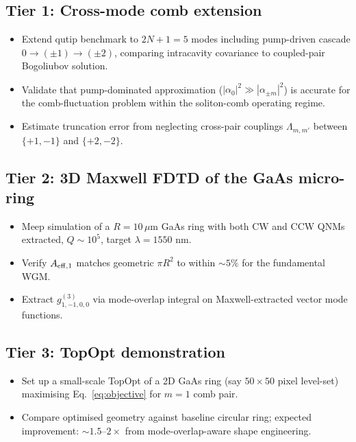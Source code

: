 \documentclass[11pt]{article}
\newcommand{\eff}{{\rm eff}}
\begin{document}
\subsection{Tier 1: Cross-mode comb extension}
\begin{itemize}\itemsep0em
\item Extend qutip benchmark to $2N+1=5$ modes including pump-driven
  cascade $0\to(\pm 1)\to(\pm 2)$, comparing intracavity covariance
  to coupled-pair Bogoliubov solution.
\item Validate that pump-dominated approximation
  ($|\alpha_0|^2\gg|\alpha_{\pm m}|^2$) is accurate for the
  comb-fluctuation problem within the soliton-comb operating regime.
\item Estimate truncation error from neglecting cross-pair couplings
  $\Lambda_{m,m'}$ between $\{+1,-1\}$ and $\{+2,-2\}$.
\end{itemize}

\subsection{Tier 2: 3D Maxwell FDTD of the GaAs micro-ring}
\begin{itemize}\itemsep0em
\item Meep simulation of a $R=10\,\mu\mathrm{m}$ GaAs ring with both
  CW and CCW QNMs extracted, $Q\sim 10^5$, target $\lambda=1550$ nm.
\item Verify $A_{\eff,1}$ matches geometric $\pi R^2$ to within
  $\sim 5\%$ for the fundamental WGM.
\item Extract $g^{(3)}_{1,-1,0,0}$ via mode-overlap integral on
  Maxwell-extracted vector mode functions.
\end{itemize}

\subsection{Tier 3: TopOpt demonstration}
\begin{itemize}\itemsep0em
\item Set up a small-scale TopOpt of a 2D GaAs ring (say
  $50\times 50$ pixel level-set) maximising
  Eq.~\eqref{eq:objective} for $m=1$ comb pair.
\item Compare optimised geometry against baseline circular ring;
  expected improvement: $\sim 1.5$--$2\times$ from
  mode-overlap-aware shape engineering.
\end{itemize}

\end{document}
